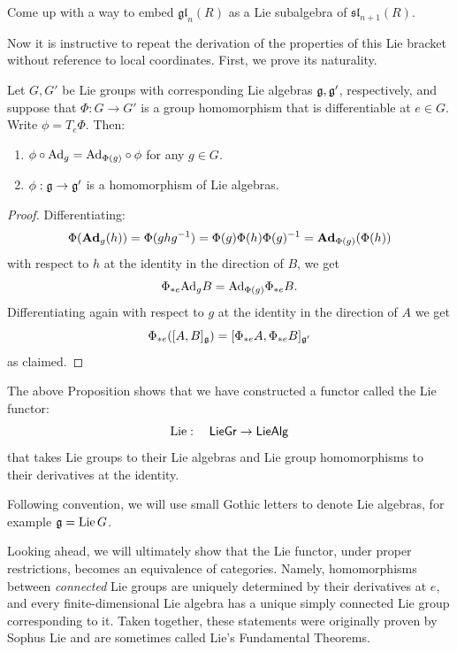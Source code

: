 \begin{xca}
    Come up with a way to embed $\mathfrak{gl}_n(R)$ as a Lie subalgebra of $\mathfrak{sl}_{n+1}(R)$.
\end{xca}


Now it is instructive to repeat the derivation of the properties of this Lie bracket without reference to local coordinates. First, we prove its naturality.

\begin{prop}[{{\cite[Prop.~1.1.3]{DK}}}]\label{prop 1.1.3 DK}
    Let $G,G'$ be Lie groups with corresponding Lie algebras $\mathfrak{g},\mathfrak{g}'$, respectively, and suppose that $\Phi:G\to G'$ is a group homomorphism that is differentiable at $e\in G$. Write $\phi=T_e \Phi$. Then:
    \begin{enumerate}
        \item $\phi\circ \mathrm{Ad}_g=\mathrm{Ad}_{\Phi(g)}\circ \phi$ for any $g\in G$.
        \item $\phi:\mathfrak{g}\to\mathfrak{g}'$ is a homomorphism of Lie algebras.
    \end{enumerate}
\end{prop}
\begin{proof}
    Differentiating:
    \[\Phi(\mathrm{\mathbf{Ad}}_g(h))=\Phi(ghg^{-1})=\Phi(g)\Phi(h)\Phi(g)^{-1}=\mathrm{\mathbf{Ad}}_{\Phi(g)}(\Phi(h))\]
    with respect to $h$ at the identity in the direction of $B$, we get
    \[\Phi_{\ast e} \mathrm{Ad}_g B=\mathrm{Ad}_{\Phi(g)} \Phi_{\ast e}B.\]
    Differentiating again with respect to $g$ at the identity in the direction of $A$ we get
    \[\Phi_{\ast e}([A,B]_{\mathfrak{g}})=[\Phi_{\ast e}A,\Phi_{\ast e}B]_{\mathfrak{g}'}\]
    as claimed.
\end{proof}
\begin{cor}
    The above Proposition shows that we have constructed a functor called the Lie functor:
    \[\operatorname{Lie}:\quad \mathsf{LieGr}\to \mathsf{LieAlg}\]
    that takes Lie groups to their Lie algebras and Lie group homomorphisms to their derivatives at the identity.
\end{cor}

\begin{rem}
    Following convention, we will use small Gothic letters to denote Lie algebras, for example $\mathfrak{g}=\operatorname{Lie} G$.
\end{rem}

\begin{rem}
    Looking ahead, we will ultimately show that the Lie functor, under proper restrictions, becomes an equivalence of categories. Namely, homomorphisms between \emph{connected} Lie groups are uniquely determined by their derivatives at $e$, and every finite-dimensional Lie algebra has a unique simply connected Lie group corresponding to it. Taken together, these statements were originally proven by Sophus Lie and are sometimes called Lie's Fundamental Theorems.
\end{rem}


